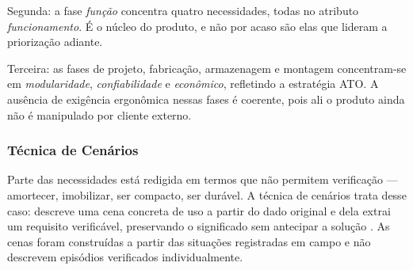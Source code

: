 Segunda: a fase \textit{função} concentra quatro necessidades, todas no atributo \textit{funcionamento}. É o núcleo do produto, e não por acaso são elas que lideram a priorização adiante.

Terceira: as fases de projeto, fabricação, armazenagem e montagem concentram-se em \textit{modularidade}, \textit{confiabilidade} e \textit{econômico}, refletindo a estratégia ATO. A ausência de exigência ergonômica nessas fases é coerente, pois ali o produto ainda não é manipulado por cliente externo.

\subsubsection{Técnica de Cenários}

Parte das necessidades está redigida em termos que não permitem verificação --- amortecer, imobilizar, ser compacto, ser durável. A técnica de cenários trata desse caso: descreve uma cena concreta de uso a partir do dado original e dela extrai um requisito verificável, preservando o significado sem antecipar a solução \citep{back2008}. As cenas foram construídas a partir das situações registradas em campo e não descrevem episódios verificados individualmente.


